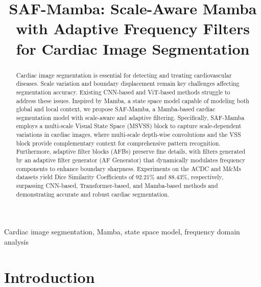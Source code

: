 \documentclass[conference]{IEEEtran}
\begin{document}
\title{SAF-Mamba: Scale-Aware Mamba with Adaptive Frequency Filters for Cardiac Image Segmentation}

\author{
}



\maketitle



\begin{abstract}
Cardiac image segmentation is essential for detecting and treating cardiovascular diseases. Scale variation and boundary displacement remain key challenges affecting segmentation accuracy. Existing CNN-based and ViT-based methods struggle to address these issues. Inspired by Mamba, a state space model capable of modeling both global and local context, we propose SAF-Mamba, a Mamba-based cardiac segmentation model with scale-aware and adaptive filtering. Specifically, SAF-Mamba employs a multi-scale Visual State Space (MSVSS) block to capture scale-dependent variations in cardiac images, where multi-scale depth-wise convolutions and the VSS block provide complementary context for comprehensive pattern recognition. Furthermore, adaptive filter blocks (AFBs) preserve fine details, with filters generated by an adaptive filter generator (AF Generator) that dynamically modulates frequency components to enhance boundary sharpness. Experiments on the ACDC and M\&Ms datasets yield Dice Similarity Coefficients of 92.21\% and 88.43\%, respectively, surpassing CNN-based, Transformer-based, and Mamba-based methods and demonstrating accurate and robust cardiac segmentation.
\end{abstract}

\begin{IEEEkeywords}
Cardiac image segmentation, Mamba, state space model, frequency domain analysis
\end{IEEEkeywords}

\section{Introduction}
\end{document}
